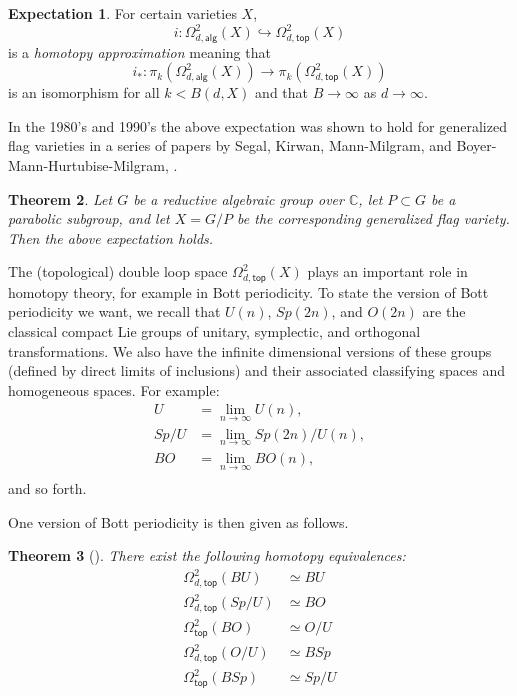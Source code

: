 \documentclass{amsart}
\newtheorem{theorem}{Theorem}[section]
\theoremstyle{definition}
\newtheorem{expectation}[theorem]{Expectation}
\newcommand{\CC} {{\mathbb C}}          %
\newcommand{\alg}{\mathsf{alg}}
\renewcommand{\top}{\mathsf{top}}
\newcommand{\LoopTwo}{\Omega^{2}_{d,\alg}}
\newcommand{\LoopTwoTop}{\Omega^{2}_{d,\top}}
\newcommand{\NoDLoopTwoTop}{\Omega^{2}_{\top}}
\newcommand{\homotopyeq}{\simeq}
\begin{document}
\begin{expectation}
For certain varieties $X$, 
\[
i:\LoopTwo (X) \hookrightarrow \LoopTwoTop
(X)
\]
is a \emph{homotopy approximation} meaning that 
\[
i_{*}:\pi_{k}(\LoopTwo (X)) \to \pi_{k}( \LoopTwoTop (X))
\]
is an isomorphism for all $k<B(d,X)$ and that $B\to \infty $ as $d\to
\infty$. 
\end{expectation}

In the 1980's and 1990's the above expectation was shown to hold for
generalized flag varieties in a series of papers by Segal, Kirwan,
Mann-Milgram, and Boyer-Mann-Hurtubise-Milgram,
\cite{Segal-1979,Kirwan-1986,Mann-Milgram-93,Boyer-Mann-Hurtubise-Milgram}.

\begin{theorem}\label{thm: Mann-Milgram algebraic loop approximation
holds for generalized flag varieties}
Let $G$ be a reductive algebraic group over $\CC$, let $P\subset G$
be a parabolic subgroup, and let $X=G/P$ be the corresponding
generalized flag variety. Then the above expectation holds.
\end{theorem}

The (topological) double loop space $\LoopTwoTop (X)$ plays an
important role in homotopy theory, for example in Bott periodicity. To
state the version of Bott periodicity we want, we recall that $U(n)$,
$Sp(2n)$, and $O(2n)$ are the classical compact Lie groups of unitary,
symplectic, and orthogonal transformations. We also have the infinite
dimensional versions of these groups (defined by direct limits of
inclusions) and their associated classifying spaces and homogeneous
spaces. For example:
\begin{align*}
U&=\lim_{n\to  \infty} U(n),\\
Sp/U& = \lim_{n\to  \infty} Sp(2n)/U(n),\\
BO& = \lim_{n\to  \infty} BO(n),\\
\end{align*}
and so forth.

One version of Bott periodicity is then given as follows.

\begin{theorem}[\cite{Bott-Periodicity-1959}]\label{thm: classical Bott periodicity as homotopy equivalences}
There exist the following homotopy equivalences:
\begin{align}
\LoopTwoTop (BU)&\homotopyeq BU \label{eqn: Omega2BU=BU}\\
\LoopTwoTop (Sp/U)&\homotopyeq BO  \label{eqn: Omega2Sp/U=BO}\\
\NoDLoopTwoTop (BO)&\homotopyeq O/U  \label{eqn: Omega2BO=O/U}\\
\LoopTwoTop (O/U)&\homotopyeq BSp  \label{eqn: Omega2O/U=BSp}\\
\NoDLoopTwoTop (BSp)&\homotopyeq Sp/U   \label{eqn: Omega2BSp=Sp/U}
\end{align}
\end{theorem}
\end{document}
